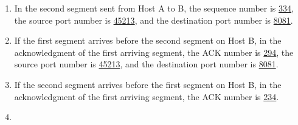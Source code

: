 \documentclass{report}
\begin{document}
\begin{problem}
\begin{answer}{33em}
\begin{enumerate}
  \item In the second segment sent from Host A to B, the sequence number is \underline{334}, the source port number is \underline{45213}, and the destination port number is \underline{8081}.
  \item If the first segment arrives before the second segment on Host B, in the acknowledgment of the first arriving segment, the ACK number is \underline{294}, the source port number is \underline{45213}, and the destination port number is \underline{8081}.
  \item If the second segment arrives before the first segment on Host B, in the acknowledgment of the first arriving segment, the ACK number is \underline{234}.
  \item 
\end{enumerate}
\end{answer}

\end{problem}
\end{document}
